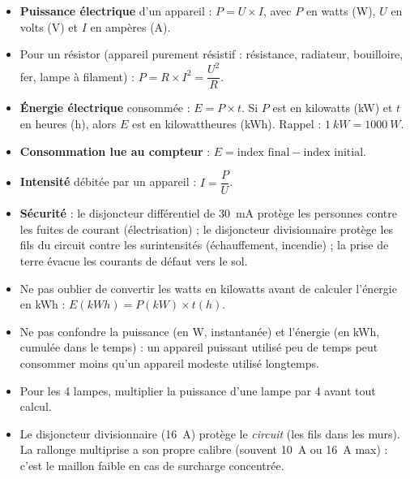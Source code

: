 \documentclass[11pt]{article}
\begin{document}
\begin{aretenir}
\begin{itemize}
\item \textbf{Puissance électrique} d'un appareil : $P = U \times I$, avec $P$ en watts (\si{W}), $U$ en volts (\si{V}) et $I$ en ampères (\si{A}).
\item Pour un résistor (appareil purement résistif : résistance, radiateur, bouilloire, fer, lampe à filament) : $P = R \times I^2 = \dfrac{U^2}{R}$.
\item \textbf{Énergie électrique} consommée : $E = P \times t$. Si $P$ est en kilowatts (\si{kW}) et $t$ en heures (h), alors $E$ est en kilowattheures (\si{kWh}). Rappel : $\SI{1}{kW} = \SI{1000}{W}$.
\item \textbf{Consommation lue au compteur} : $E = \text{index final} - \text{index initial}$.
\item \textbf{Intensité} débitée par un appareil : $I = \dfrac{P}{U}$.
\item \textbf{Sécurité} : le disjoncteur différentiel de \SI{30}{mA} protège les personnes contre les fuites de courant (électrisation) ; le disjoncteur divisionnaire protège les fils du circuit contre les surintensités (échauffement, incendie) ; la prise de terre évacue les courants de défaut vers le sol.
\end{itemize}
\end{aretenir}

\begin{attention}
\begin{itemize}
\item Ne pas oublier de convertir les watts en kilowatts avant de calculer l'énergie en \si{kWh} : $E(\si{kWh}) = P(\si{kW}) \times t(\si{h})$.
\item Ne pas confondre la puissance (en \si{W}, instantanée) et l'énergie (en \si{kWh}, cumulée dans le temps) : un appareil puissant utilisé peu de temps peut consommer moins qu'un appareil modeste utilisé longtemps.
\item Pour les 4 lampes, multiplier la puissance d'une lampe par 4 avant tout calcul.
\item Le disjoncteur divisionnaire (\SI{16}{A}) protège le \emph{circuit} (les fils dans les murs). La rallonge multiprise a son propre calibre (souvent \SI{10}{A} ou \SI{16}{A} max) : c'est le maillon faible en cas de surcharge concentrée.
\end{itemize}
\end{attention}
\end{document}
